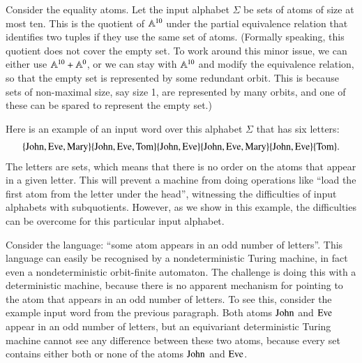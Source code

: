 \begin{myexample}\label{example:deatomisation-set}
	Consider the equality atoms. Let the input alphabet $\Sigma$  be sets of atoms of size at most ten. This is the quotient of $\mathbb A^{10}$ under the partial equivalence relation that identifies two tuples if they use the same set of atoms. (Formally speaking, this quotient does not cover the empty set. To work around this minor issue, we can either use $\mathbb A^{10}+\mathbb A^0$, or  we can stay with $\mathbb A^{10}$ and  modify the equivalence relation, so that the empty set is represented by some redundant orbit. This is because sets of non-maximal size, say size 1,  are represented by many orbits, and one of these can be spared to represent the empty set.) 
	
	Here is an example of an input word over this alphabet $\Sigma$ that has six letters:
	\begin{align*}
		\{\text{John},\text{Eve},\text{Mary}\} \{\text{John},\text{Eve},\text{Tom}\}
		\{\text{John},\text{Eve}\} \{\text{John},\text{Eve},\text{Mary}\}	 \{\text{John},\text{Eve}\} \{\text{Tom}\}.
	\end{align*}
The letters are sets, which means that there is no order on the atoms that appear in a given letter. This will prevent a machine from doing operations like ``load the first atom from the letter under the head'', witnessing the difficulties of input alphabets with subquotients. However, as we show in this example, the difficulties can be overcome for this particular input alphabet. 

Consider the language: ``some atom appears in an odd number of letters''.	This language can easily be recognised by a nondeterministic Turing machine, in fact even a nondeterministic orbit-finite automaton. The challenge is doing this with a deterministic machine, because there is no apparent mechanism for pointing to the atom that appears in an odd number of letters.  To see this, consider the example input word from the previous paragraph.	Both atoms $\text{John}$ and $\text{Eve}$ appear in an odd number of letters, but an equivariant deterministic Turing machine cannot see any difference between these two atoms, because every set contains either both or none of the atoms $\text{John}$ and $\text{Eve}$.


\end{myexample}
